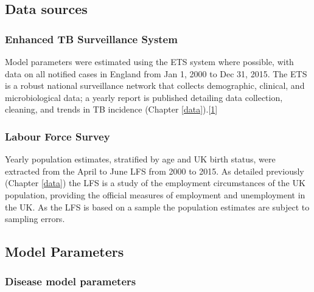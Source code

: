 \documentclass[11pt,twoside]{bristolthesis}
\begin{document}
  \hypertarget{data-sources-1}{%
  \subsection{Data sources}\label{data-sources-1}}
  
  \hypertarget{enhanced-tb-surveillance-system}{%
  \subsubsection{Enhanced TB Surveillance System}\label{enhanced-tb-surveillance-system}}
  
  Model parameters were estimated using the ETS system where possible, with data on all notified cases in England from Jan 1, 2000 to Dec 31, 2015. The ETS is a robust national surveillance network that collects demographic, clinical, and microbiological data; a yearly report is published detailing data collection, cleaning, and trends in TB incidence (Chapter \ref{data}).{[}\protect\hyperlink{ref-PHE2017}{1}{]}
  
  \hypertarget{labour-force-survey}{%
  \subsubsection{Labour Force Survey}\label{labour-force-survey}}
  
  Yearly population estimates, stratified by age and UK birth status, were extracted from the April to June LFS from 2000 to 2015. As detailed previously (Chapter \ref{data}) the LFS is a study of the employment circumstances of the UK population, providing the official measures of employment and unemployment in the UK. As the LFS is based on a sample the population estimates are subject to sampling errors.
  
  \hypertarget{model-parameters}{%
  \subsection{Model Parameters}\label{model-parameters}}
  
  \hypertarget{disease-model-parameters}{%
  \subsubsection{Disease model parameters}\label{disease-model-parameters}}
  
\end{document}
